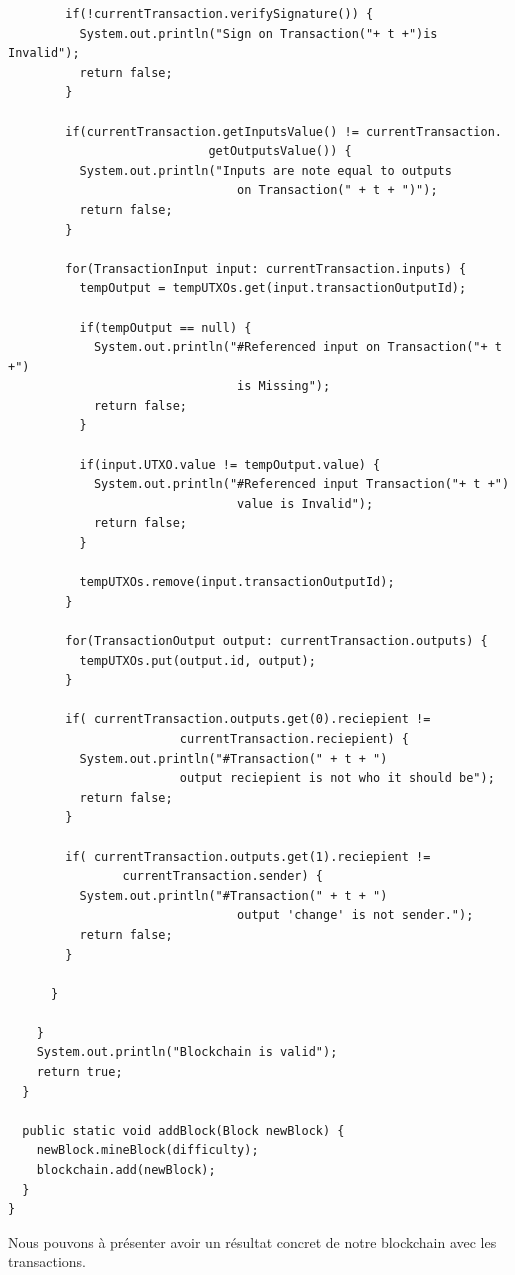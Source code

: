 \documentclass[12pt]{report}
\begin{document}
\begin{lstlisting}
        if(!currentTransaction.verifySignature()) {
          System.out.println("Sign on Transaction("+ t +")is Invalid");
          return false; 
        }
        
        if(currentTransaction.getInputsValue() != currentTransaction.
                            getOutputsValue()) {
          System.out.println("Inputs are note equal to outputs 
                                on Transaction(" + t + ")");
          return false; 
        }
				
        for(TransactionInput input: currentTransaction.inputs) {	
          tempOutput = tempUTXOs.get(input.transactionOutputId);
					
          if(tempOutput == null) {
            System.out.println("#Referenced input on Transaction("+ t +") 
                                is Missing");
            return false;
          }
					
          if(input.UTXO.value != tempOutput.value) {
            System.out.println("#Referenced input Transaction("+ t +") 
                                value is Invalid");
            return false;
          }
					
          tempUTXOs.remove(input.transactionOutputId);
        }
				
        for(TransactionOutput output: currentTransaction.outputs) {
          tempUTXOs.put(output.id, output);
        }
				
        if( currentTransaction.outputs.get(0).reciepient != 
                        currentTransaction.reciepient) {
          System.out.println("#Transaction(" + t + ") 
                        output reciepient is not who it should be");
          return false;
        }

        if( currentTransaction.outputs.get(1).reciepient != 
                currentTransaction.sender) {
          System.out.println("#Transaction(" + t + ") 
                                output 'change' is not sender.");
          return false;
        }
				
      }
			
    }
    System.out.println("Blockchain is valid");
    return true;
  }
	
  public static void addBlock(Block newBlock) {
    newBlock.mineBlock(difficulty);
    blockchain.add(newBlock);
  }
}

\end{lstlisting}

Nous pouvons à présenter avoir un résultat concret de notre blockchain avec les transactions.
\end{document}
